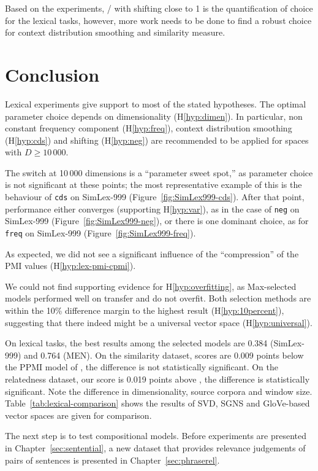Based on the experiments, \logNSCPMI/ with shifting close to 1 is the quantification of choice for the lexical tasks, however, more work needs to be done to find a robust choice for context distribution smoothing and similarity measure.

\section{Conclusion}
\label{sec:conclusion-lexical}

Lexical experiments give support to most of the stated hypotheses. The optimal parameter choice depends on dimensionality (H\ref{hyp:dimen}). In particular, non constant frequency component (H\ref{hyp:freq}), context distribution smoothing (H\ref{hyp:cds}) and shifting (H\ref{hyp:neg}) are recommended to be applied for spaces with $D \geq 10\,000$.

The switch at 10\,000 dimensions is a ``parameter sweet spot,'' as parameter choice is not significant at these points; the most representative example of this is the behaviour of \texttt{cds} on SimLex-999 (Figure~\ref{fig:SimLex999-cds}). After that point, performance either converges (supporting H\ref{hyp:var}), as in the case of \texttt{neg} on SimLex-999 (Figure~\ref{fig:SimLex999-neg}), or there is one dominant choice, as for \texttt{freq} on SimLex-999 (Figure~\ref{fig:SimLex999-freq}).

As expected, we did not see a significant influence of the ``compression'' of the PMI values (H\ref{hyp:lex-pmi-cpmi}).

We could not find supporting evidence for H\ref{hyp:overfitting}, as Max-selected models performed well on transfer and do not overfit. Both selection methods are within the 10\% difference margin to the highest result (H\ref{hyp:10percent}), suggesting that there indeed might be a universal vector space (H\ref{hyp:universal}).

 On lexical tasks, the best results among the selected models are 0.384 (SimLex-999) and 0.764 (MEN). On the similarity dataset, scores are 0.009 points below the PPMI model of , the difference is not statistically significant. On the relatedness dataset, our score is 0.019 points above \citet{TACL570}, the difference is statistically significant. Note the difference in dimensionality, source corpora and window size. Table~\ref{tab:lexical-comparison} shows the results of SVD, SGNS and GloVe-based vector spaces are given for comparison.

The next step is to test compositional models. Before experiments are presented in Chapter~\ref{sec:sentential}, a new dataset that provides relevance judgements of pairs of sentences is presented in Chapter~\ref{sec:phraserel}.


